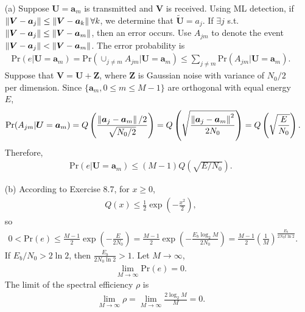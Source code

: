 \documentclass{assignment}
\begin{document}
\begin{sol}
    \begin{itemize}
        \item[(a)] Suppose $\bm{U}=\bm{a}_m$ is transmitted and $\bm{V}$ is received. Using ML detection, if $\left\lVert\bm{V}-\bm{a}_j\right\rVert\leq\left\lVert\bm{V}-\bm{a}_k\right\rVert\forall k$, we determine that $\tilde{\bm{U}}=a_j$. If $\exists j$ s.t. $\left\lVert\bm{V}-\bm{a}_j\right\rVert\leq\left\lVert\bm{V}-\bm{a}_m\right\rVert$, then an error occurs. Use $A_{jm}$ to denote the event $\left\lVert\bm{V}-\bm{a}_j\right\rVert<\left\lVert\bm{V}-\bm{a}_m\right\rVert$. The error probability is
        \begin{align}
            \mathrm{Pr}(e\vert\bm{U}=\bm{a}_m)=\mathrm{Pr}(\cup_{j\neq m}A_{jm}\vert\bm{U}=\bm{a}_m)\leq\sum_{j\neq m}\mathrm{Pr}(A_{jm}\vert\bm{U}=\bm{a}_m).
        \end{align}
        Suppose that $\bm{V}=\bm{U}+\bm{Z}$, where $\bm{Z}$ is Gaussian noise with variance of $N_0/2$ per dimension. Since $\{\bm{a}_m,0\leq m\leq M-1\}$ are orthogonal with equal energy $E$,
        \begin{align}
            \mathrm{Pr}(A_{jm}\vert\bm{U}=\bm{a}_m)=Q\left(\frac{\left\lVert\bm{a}_j-\bm{a}_m\right\rVert/2}{\sqrt{N_0/2}}\right)=Q\left(\sqrt{\frac{\left\lVert\bm{a}_j-\bm{a}_m\right\rVert^2}{2N_0}}\right)=Q\left(\sqrt{\frac{E}{N_0}}\right).
        \end{align}
        Therefore,
        \begin{align}
            \mathrm{Pr}(e\vert\bm{U}=\bm{a}_m)\leq(M-1)Q(\sqrt{E/N_0}).
        \end{align}
        \item[(b)] According to Exercise 8.7, for $x\geq 0$,
        \begin{align}
            Q(x)\leq\frac{1}{2}\exp\left(-\frac{x^2}{2}\right),
        \end{align}
        so
        \begin{align}
            0<\mathrm{Pr}(e)\leq\frac{M-1}{2}\exp\left(-\frac{E}{2N_0}\right)=\frac{M-1}{2}\exp\left(-\frac{E_b\log_2M}{2N_0}\right)=\frac{M-1}{2}\left(\frac{1}{M}\right)^{\frac{E_b}{2N_0t\ln 2}}.
        \end{align}
        If $E_b/N_0>2\ln 2$, then $\frac{E_b}{2N_0\ln 2}>1$. Let $M\rightarrow\infty$,
        \begin{align}
            \lim_{M\rightarrow\infty}\mathrm{Pr}(e)=0.
        \end{align}
        The limit of the spectral efficiency $\rho$ is
        \begin{align}
            \lim_{M\rightarrow\infty}\rho=\lim_{M\rightarrow\infty}\frac{2\log_2M}{M}=0.
        \end{align}
    \end{itemize}
\end{sol}
\end{document}
